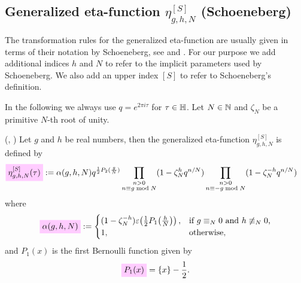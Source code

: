 \documentclass{article}
\begin{document}
\subsection{Generalized eta-function $\eta_{g,h,N}^{[S]}$ (Schoeneberg)}

The transformation rules for the generalized eta-function are
usually given in terms of their notation by Schoeneberg, see
\cite[Chp.~VIII]{Schoeneberg_EllipticModularFunctions_1974} and
\cite{ChenDuZhao_FindingModularFunctionsRamanujan_2019}. For our
purpose we add additional indices $h$ and $N$ to refer to the
implicit parameters used by Schoeneberg. We also add an upper index
$[S]$ to refer to Schoeneberg's definition.

In the following we always use $q = e^{2\pi i \tau}$ for $\tau \in
\mathbb{H}$.
%
Let $N \in \mathbb{N}$ and $\zeta_N$ be a primitive $N$-th root of unity.

\begin{Definition}
  \label{eq:def:eta_g-h^[S](tau)}
  (\cite{Schoeneberg_EllipticModularFunctions_1974},
  \cite[p.~672]{Yang_GeneralizedDedekindEtaFunctions_2004})
  Let $g$ and $h$ be
  real numbers, then the generalized eta-function $\eta_{g,h,N}^{[S]}$
  is defined by
\begin{align}
  \defineNotation[eta-g-h-N-tau-Schoeneberg]{\eta_{g,h,N}^{[S]}(\tau)}
  &:=
  \alpha(g,h,N) q^{\frac{1}{2} P_2(\frac{g}{N})}
  \prod_{\substack{n>0\\n\equiv g \bmod N}}
       (1-\zeta_N^h q^{n/N})
  \prod_{\substack{n>0\\n\equiv -g \bmod N}}
       (1-\zeta_N^{-h} q^{n/N})
  \label{eq:def:eta_g-h-N^[S](tau)}
\end{align}
where
\begin{gather}
  \defineNotation[alpha-g-h-N]{\alpha(g,h,N)}
  :=
  \begin{cases}
    (1 - \zeta_N^{-h}) \unityPower{\frac{1}{2} P_1\!\left(\frac{h}{N}\right)},
    &
    \text{if $g\equiv_N 0$ and $h\not\equiv_N 0$,}
    \\
    1, & \text{otherwise},
  \end{cases}
  \label{eq:eta_g-h-N^[S](tau)-prefactor}
\end{gather}
and $P_1(x)$ is the first Bernoulli function given by
\begin{gather*}
  \defineNotation[P-1]{P_1(x)}
  =
  \{x\} - \frac{1}{2}.
\end{gather*}
\end{Definition}
\end{document}
